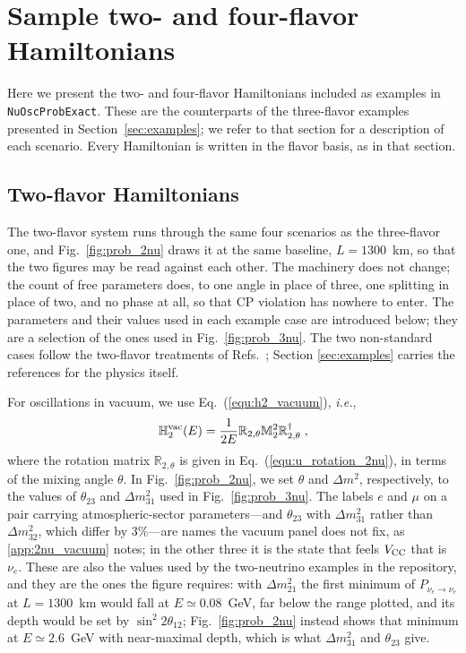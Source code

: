 \documentclass[final,5p,times,twocolumn,sort,compress]{elsarticle}
\newcommand{\ie}{{\it i.e.}}
\newcommand{\eq}{Eq.}
\newcommand{\fig}{Fig.}
\newcommand{\Refs}{Refs.}
\newcommand{\equ}[1]{\eq~(\ref{equ:#1})}
\newcommand{\figu}[1]{\fig~\ref{fig:#1}}
\begin{document}

\section{Sample two- and four-flavor Hamiltonians}
\label{app:sample_2nu_hamiltonians}
\appresetfloats

Here we present the two- and four-flavor Hamiltonians included as examples in {\tt NuOscProbExact}.  These are the counterparts of the three-flavor examples presented in Section\ \ref{sec:examples}; we refer to that section for a description of each scenario.  Every Hamiltonian is written in the flavor basis, as in that section.


\subsection{Two-flavor Hamiltonians}

The two-flavor system runs through the same four scenarios as the three-flavor one, and \figu{prob_2nu} draws it at the same baseline, $L = 1300$~km, so that the two figures may be read against each other.  The machinery does not change; the count of free parameters does, to one angle in place of three, one splitting in place of two, and no phase at all, so that CP violation has nowhere to enter.  The parameters and their values used in each example case are introduced below; they are a selection of the ones used in \figu{prob_3nu}.  The two non-standard cases follow the two-flavor treatments of \Refs\ \cite{GonzalezGarcia:2004wg, GonzalezGarcia:2005xw}; Section \ref{sec:examples} carries the references for the physics itself.

For oscillations in vacuum, we use \equ{h2_vacuum}, \ie,
\begin{equation}
 \mathbb{H}_2^{\rm vac}(E)
 =
 \frac{1}{2E}
 \mathbb{R}_{2,\theta}
 \mathbb{M}_2^2
 \mathbb{R}_{2,\theta}^\dagger \;,
\end{equation}
where the rotation matrix $\mathbb{R}_{2,\theta}$ is given in \equ{u_rotation_2nu}, in terms of the mixing angle $\theta$.  In \figu{prob_2nu}, we set $\theta$ and $\Delta m^2$, respectively, to the values of $\theta_{23}$ and $\Delta m_{31}^2$ used in \figu{prob_3nu}.  The labels $e$ and $\mu$ on a pair carrying atmospheric-sector parameters---and $\theta_{23}$ with $\Delta m_{31}^2$ rather than $\Delta m_{32}^2$, which differ by $3\%$---are names the vacuum panel does not fix, as \ref{app:2nu_vacuum} notes; in the other three it is the state that feels $V_{\rm CC}$ that is $\nu_e$.  These are also the values used by the two-neutrino examples in the repository, and they are the ones the figure requires: with $\Delta m_{21}^2$ the first minimum of $P_{\nu_e \to \nu_e}$ at $L = 1300$~km would fall at $E \simeq 0.08$~GeV, far below the range plotted, and its depth would be set by $\sin^2 2\theta_{12}$; \figu{prob_2nu} instead shows that minimum at $E \simeq 2.6$~GeV with near-maximal depth, which is what $\Delta m_{31}^2$ and $\theta_{23}$ give.
\end{document}
